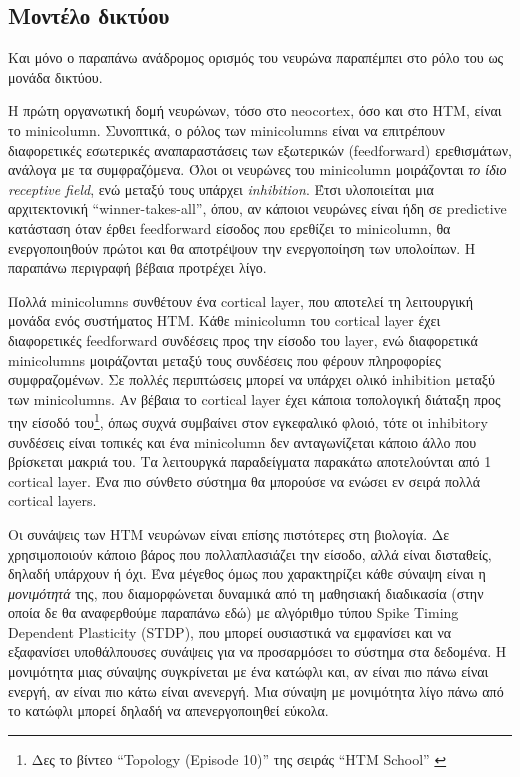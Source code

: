 \subsection{Μοντέλο δικτύου}

Και μόνο ο παραπάνω ανάδρομος ορισμός του νευρώνα παραπέμπει στο ρόλο του ως μονάδα δικτύου.

Η πρώτη οργανωτική δομή νευρώνων, τόσο στο neocortex, όσο και στο HTM, είναι το minicolumn.
Συνοπτικά, ο ρόλος των minicolumns είναι να επιτρέπουν διαφορετικές εσωτερικές αναπαραστάσεις των εξωτερικών (feedforward) ερεθισμάτων, ανάλογα με τα συμφραζόμενα.
Όλοι οι νευρώνες του minicolumn μοιράζονται \emph{το ίδιο receptive field}, ενώ μεταξύ τους υπάρχει \emph{inhibition}.
Έτσι υλοποιείται μια αρχιτεκτονική ``winner-takes-all'', όπου, αν κάποιοι νευρώνες είναι ήδη σε predictive κατάσταση όταν έρθει feedforward είσοδος που ερεθίζει το minicolumn, θα ενεργοποιηθούν πρώτοι και θα αποτρέψουν την ενεργοποίηση των υπολοίπων.
Η παραπάνω περιγραφή βέβαια προτρέχει λίγο.

Πολλά minicolumns συνθέτουν ένα cortical layer, που αποτελεί τη λειτουργική μονάδα ενός συστήματος HTM.
Κάθε minicolumn του cortical layer έχει διαφορετικές feedforward συνδέσεις προς την είσοδο του layer, ενώ διαφορετικά minicolumns μοιράζονται μεταξύ τους συνδέσεις που φέρουν πληροφορίες συμφραζομένων.
Σε πολλές περιπτώσεις μπορεί να υπάρχει ολικό inhibition μεταξύ των minicolumns.
Αν βέβαια το cortical layer έχει κάποια τοπολογική διάταξη προς την είσοδό του\footnote{Δες το βίντεο ``Topology (Episode 10)'' της σειράς ``HTM School'' \cite{htmschool}}, όπως συχνά συμβαίνει στον εγκεφαλικό φλοιό, τότε οι inhibitory συνδέσεις είναι τοπικές και ένα minicolumn δεν ανταγωνίζεται κάποιο άλλο που βρίσκεται μακριά του.
Τα λειτουργκά παραδείγματα παρακάτω αποτελούνται από 1 cortical layer.
Ένα πιο σύνθετο σύστημα θα μπορούσε να ενώσει εν σειρά πολλά cortical layers.

Οι συνάψεις των HTM νευρώνων είναι επίσης πιστότερες στη βιολογία.
Δε χρησιμοποιούν κάποιο βάρος που πολλαπλασιάζει την είσοδο, αλλά είναι δισταθείς, δηλαδή υπάρχουν ή όχι.
Ένα μέγεθος όμως που χαρακτηρίζει κάθε σύναψη είναι η \emph{μονιμότητά} της, που διαμορφώνεται δυναμικά από τη μαθησιακή διαδικασία (στην οποία δε θα αναφερθούμε παραπάνω εδώ) με αλγόριθμο τύπου Spike Timing Dependent Plasticity (STDP), που μπορεί ουσιαστικά να εμφανίσει και να εξαφανίσει υποθάλπουσες συνάψεις για να προσαρμόσει το σύστημα στα δεδομένα.
Η μονιμότητα μιας σύναψης συγκρίνεται με ένα κατώφλι και, αν είναι πιο πάνω είναι ενεργή, αν είναι πιο κάτω είναι ανενεργή.
Μια σύναψη με μονιμότητα λίγο πάνω από το κατώφλι μπορεί δηλαδή να απενεργοποιηθεί εύκολα.


